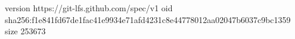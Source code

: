 version https://git-lfs.github.com/spec/v1
oid sha256:f1e841fd67de1fac41e9934e71afd4231c8e44778012aa02047b6037c9bc1359
size 253673
